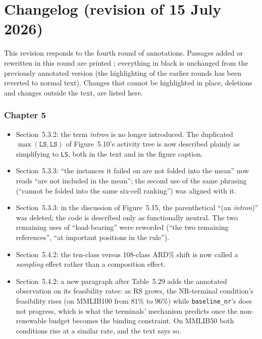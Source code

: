 
\chapter*{Changelog (revision of 15 July 2026)}

This revision responds to the fourth round of annotations. Passages added
or rewritten in this round are printed ;
everything in black is unchanged from the previously annotated version
(the highlighting of the earlier rounds has been reverted to normal
text). Changes that cannot be highlighted in place, deletions and changes
outside the text, are listed here.

\subsection*{Chapter 5}
\begin{itemize}
  \item Section~5.3.2: the term \emph{intron} is no longer introduced.
        The duplicated $\max(\texttt{LS}, \texttt{LS})$ of Figure~5.10's
        activity tree is now described plainly as simplifying to
        \texttt{LS}, both in the text and in the figure caption.
  \item Section~5.3.3: ``the instances it failed on are not folded into
        the mean'' now reads ``are not included in the mean''; the second
        use of the same phrasing (``cannot be folded into the same
        six-cell ranking'') was aligned with it.
  \item Section~5.3.3: in the discussion of Figure~5.15, the
        parenthetical ``(an \emph{intron})'' was deleted; the code is
        described only as functionally neutral. The two remaining uses of
        ``load-bearing'' were reworded (``the two remaining references'',
        ``at important positions in the rule'').
  \item Section~5.4.2: the ten-class versus 108-class ARD\% shift is now
        called a \emph{sampling} effect rather than a composition effect.
  \item Section~5.4.2: a new paragraph after Table~5.29 adds the
        annotated observation on its feasibility rates: as RS grows, the
        NR-terminal condition's feasibility rises (on MMLIB100 from
        $81\%$ to $96\%$) while \texttt{baseline\_nr}'s does not progress,
        which is what the terminals' mechanism predicts once the
        non-renewable budget becomes the binding constraint. On MMLIB50
        both conditions rise at a similar rate, and the text says so.
\end{itemize}

